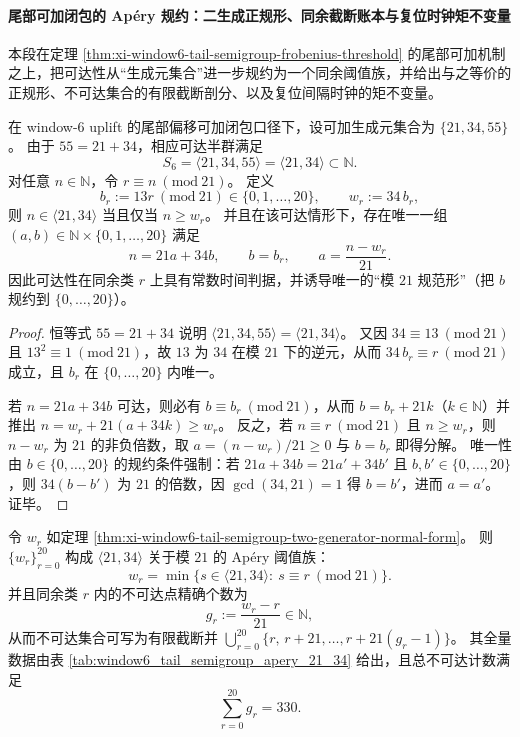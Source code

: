 \paragraph{尾部可加闭包的 Ap\'ery 规约：二生成正规形、同余截断账本与复位时钟矩不变量}
本段在定理 \ref{thm:xi-window6-tail-semigroup-frobenius-threshold} 的尾部可加机制之上，把可达性从“生成元集合”进一步规约为一个同余阈值族，并给出与之等价的正规形、不可达集合的有限截断剖分、以及复位间隔时钟的矩不变量。
\par

\begin{theorem}[尾部可加机制的二生成规约与规范解]\label{thm:xi-window6-tail-semigroup-two-generator-normal-form}
在 window-\(6\) uplift 的尾部偏移可加闭包口径下，设可加生成元集合为 \(\{21,34,55\}\)。
由于 \(55=21+34\)，相应可达半群满足
\[
S_6=\langle 21,34,55\rangle=\langle 21,34\rangle\subset\mathbb N.
\]
对任意 \(n\in\mathbb N\)，令 \(r\equiv n\ (\mathrm{mod}\ 21)\)。
定义
\[
b_r:=13r\ (\mathrm{mod}\ 21)\in\{0,1,\dots,20\},
\qquad
w_r:=34\,b_r,
\]
则 \(n\in\langle 21,34\rangle\) 当且仅当 \(n\ge w_r\)。
并且在该可达情形下，存在唯一一组
\(
(a,b)\in\mathbb N\times\{0,1,\dots,20\}
\)
满足
\[
n=21a+34b,\qquad b=b_r,\qquad a=\frac{n-w_r}{21}.
\]
因此可达性在同余类 \(r\) 上具有常数时间判据，并诱导唯一的“模 \(21\) 规范形”（把 \(b\) 规约到 \(\{0,\dots,20\}\)）。
\end{theorem}

\begin{proof}
恒等式 \(55=21+34\) 说明 \(\langle 21,34,55\rangle=\langle 21,34\rangle\)。
又因 \(34\equiv 13\ (\mathrm{mod}\ 21)\) 且 \(13^2\equiv 1\ (\mathrm{mod}\ 21)\)，故 \(13\) 为 \(34\) 在模 \(21\) 下的逆元，从而
\(
34\,b_r\equiv r\ (\mathrm{mod}\ 21)
\)
成立，且 \(b_r\) 在 \(\{0,\dots,20\}\) 内唯一。
\par
若 \(n=21a+34b\) 可达，则必有 \(b\equiv b_r\ (\mathrm{mod}\ 21)\)，从而 \(b=b_r+21k\)（\(k\in\mathbb N\)）并推出
\(
n=w_r+21(a+34k)\ge w_r
\)。
反之，若 \(n\equiv r\ (\mathrm{mod}\ 21)\) 且 \(n\ge w_r\)，则 \(n-w_r\) 为 \(21\) 的非负倍数，取 \(a=(n-w_r)/21\ge 0\) 与 \(b=b_r\) 即得分解。
唯一性由 \(b\in\{0,\dots,20\}\) 的规约条件强制：若 \(21a+34b=21a'+34b'\) 且 \(b,b'\in\{0,\dots,20\}\)，则 \(34(b-b')\) 为 \(21\) 的倍数，因 \(\gcd(34,21)=1\) 得 \(b=b'\)，进而 \(a=a'\)。证毕。
\end{proof}

\begin{proposition}\label{prop:xi-window6-tail-semigroup-apery-thresholds}
令 \(w_r\) 如定理 \ref{thm:xi-window6-tail-semigroup-two-generator-normal-form}。
则 \(\{w_r\}_{r=0}^{20}\) 构成 \(\langle 21,34\rangle\) 关于模 \(21\) 的 Ap\'ery 阈值族：
\[
w_r=\min\{s\in\langle 21,34\rangle:\ s\equiv r\ (\mathrm{mod}\ 21)\}.
\]
并且同余类 \(r\) 内的不可达点精确个数为
\[
g_r:=\frac{w_r-r}{21}\in\mathbb N,
\]
从而不可达集合可写为有限截断并
\(
\bigcup_{r=0}^{20}\{r,\,r+21,\dots,r+21(g_r-1)\}
\)。
其全量数据由表 \ref{tab:window6_tail_semigroup_apery_21_34} 给出，且总不可达计数满足
\[
\sum_{r=0}^{20}g_r=330.
\]
\end{proposition}


